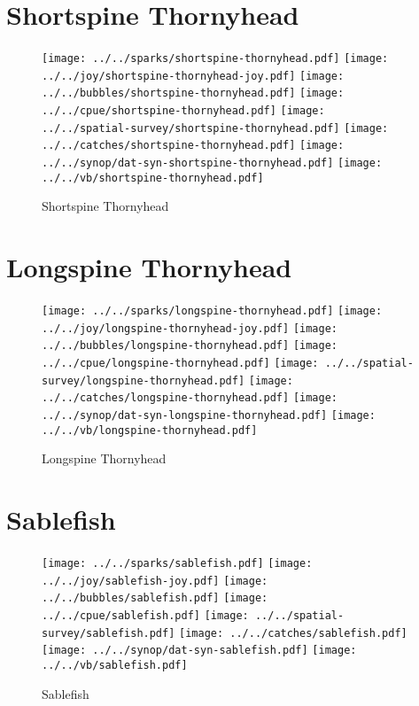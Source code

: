 \section{Shortspine Thornyhead}

\begin{figure}[htbp]
\centering
\texttt{[image: ../../sparks/shortspine-thornyhead.pdf]}
\texttt{[image: ../../joy/shortspine-thornyhead-joy.pdf]}
\texttt{[image: ../../bubbles/shortspine-thornyhead.pdf]}
\texttt{[image: ../../cpue/shortspine-thornyhead.pdf]}
\texttt{[image: ../../spatial-survey/shortspine-thornyhead.pdf]}
\texttt{[image: ../../catches/shortspine-thornyhead.pdf]}
\texttt{[image: ../../synop/dat-syn-shortspine-thornyhead.pdf]}
\texttt{[image: ../../vb/shortspine-thornyhead.pdf]}
\caption{Shortspine Thornyhead}
\end{figure}
\clearpage
\section{Longspine Thornyhead}

\begin{figure}[htbp]
\centering
\texttt{[image: ../../sparks/longspine-thornyhead.pdf]}
\texttt{[image: ../../joy/longspine-thornyhead-joy.pdf]}
\texttt{[image: ../../bubbles/longspine-thornyhead.pdf]}
\texttt{[image: ../../cpue/longspine-thornyhead.pdf]}
\texttt{[image: ../../spatial-survey/longspine-thornyhead.pdf]}
\texttt{[image: ../../catches/longspine-thornyhead.pdf]}
\texttt{[image: ../../synop/dat-syn-longspine-thornyhead.pdf]}
\texttt{[image: ../../vb/longspine-thornyhead.pdf]}
\caption{Longspine Thornyhead}
\end{figure}
\clearpage
\section{Sablefish}

\begin{figure}[htbp]
\centering
\texttt{[image: ../../sparks/sablefish.pdf]}
\texttt{[image: ../../joy/sablefish-joy.pdf]}
\texttt{[image: ../../bubbles/sablefish.pdf]}
\texttt{[image: ../../cpue/sablefish.pdf]}
\texttt{[image: ../../spatial-survey/sablefish.pdf]}
\texttt{[image: ../../catches/sablefish.pdf]}
\texttt{[image: ../../synop/dat-syn-sablefish.pdf]}
\texttt{[image: ../../vb/sablefish.pdf]}
\caption{Sablefish}
\end{figure}
\clearpage
